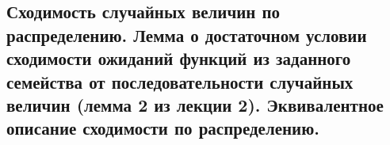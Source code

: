 \subsection{Сходимость случайных величин по распределению. Лемма о достаточном условии сходимости ожиданий функций из заданного семейства от последовательности случайных величин (лемма 2 из лекции 2). Эквивалентное описание сходимости по распределению.}